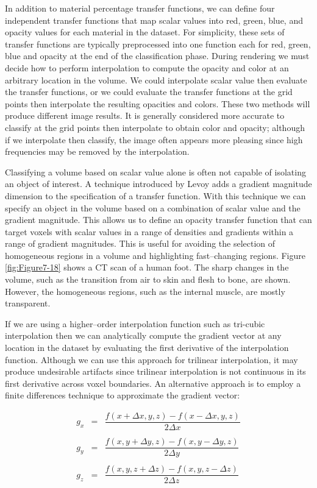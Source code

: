 In addition to material percentage transfer functions, we can define four independent transfer functions that map scalar values into red, green, blue, and opacity values for each material in the dataset. For simplicity, these sets of transfer functions are typically preprocessed into one function each for red, green, blue and opacity at the end of the classification phase. During rendering we must decide how to perform interpolation to compute the opacity and color at an arbitrary location in the volume. We could interpolate scalar value then evaluate the transfer functions, or we could evaluate the transfer functions at the grid points then interpolate the resulting opacities and colors. These two methods will produce different image results. It is generally considered more accurate to classify at the grid points then interpolate to obtain color and opacity; although if we interpolate then classify, the image often appears more pleasing since high frequencies may be removed by the interpolation.

Classifying a volume based on scalar value alone is often not capable of isolating an object of interest. A technique introduced by Levoy \cite{Levoy88} adds a gradient magnitude dimension to the specification of a transfer function. With this technique we can specify an object in the volume based on a combination of scalar value and the gradient magnitude. This allows us to define an opacity transfer function that can target voxels with scalar values in a range of densities and gradients within a range of gradient magnitudes. This is useful for avoiding the selection of homogeneous regions in a volume and highlighting fast--changing regions. Figure \ref{fig:Figure7-18} shows a CT scan of a human foot. The sharp changes in the volume, such as the transition from air to skin and flesh to bone, are shown. However, the homogeneous regions, such as the internal muscle, are mostly transparent.

If we are using a higher--order interpolation function such as tri-cubic interpolation then we can analytically compute the gradient vector at any location in the dataset by evaluating the first derivative of the interpolation function. Although we can use this approach for trilinear interpolation, it may produce undesirable artifacts since trilinear interpolation is not continuous in its first derivative across voxel boundaries. An alternative approach is to employ a finite differences technique to approximate the gradient vector:

\begin{equation}\label{eq:7.3}
\begin{array}{lll}
g_x &=& \dfrac{f(x + \Delta x, y, z) - f(x - \Delta x, y, z)}{2 \Delta x} \\ \\
g_y &=& \dfrac{f(x, y + \Delta y, z) - f(x, y - \Delta y, z)}{2 \Delta y} \\ \\
g_z &=& \dfrac{f(x, y, z + \Delta z) - f(x, y, z - \Delta z)}{2 \Delta z}
\end{array}
\end{equation}

